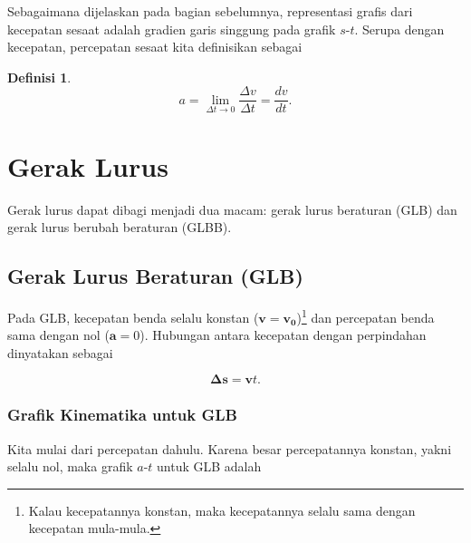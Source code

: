 \documentclass[12pt, a4paper]{article}\usepackage[utf8]{inputenc}
\theoremstyle{plain}
\theoremstyle{plain}
\numberwithin{equation}{section}
\theoremstyle{definition}
\newtheorem{defin}[teorema]{Definisi}
\begin{document}
	Sebagaimana dijelaskan pada bagian sebelumnya, representasi grafis dari kecepatan sesaat adalah gradien garis singgung pada grafik $s$-$t$. Serupa dengan kecepatan, percepatan sesaat kita definisikan sebagai
	
	\begin{defin}
		\vspace{-1em}
		\begin{equation*}
			a = \lim_{\Delta t \to 0} \frac{\Delta v}{\Delta t} = \frac{dv}{dt}.
		\end{equation*}
	\end{defin}
	
	\pagebreak
	
	\section{Gerak Lurus}
	Gerak lurus dapat dibagi menjadi dua macam: gerak lurus beraturan (GLB) dan gerak lurus berubah beraturan (GLBB).
	
	\subsection{Gerak Lurus Beraturan (GLB)}
	
	Pada GLB, kecepatan benda selalu konstan ($\boldsymbol{v} = \boldsymbol{v_0}$)\footnote{Kalau kecepatannya konstan, maka kecepatannya selalu sama dengan kecepatan mula-mula.} dan percepatan benda sama dengan nol ($\boldsymbol{a} = 0$). Hubungan antara kecepatan dengan perpindahan dinyatakan sebagai
	
	\begin{equation}
		\boldsymbol{\Delta s} = \boldsymbol{v} t.
	\end{equation}

	\subsubsection{Grafik Kinematika untuk GLB}
	
	Kita mulai dari percepatan dahulu. Karena besar percepatannya konstan, yakni selalu nol, maka grafik $a$-$t$ untuk GLB adalah
	
\end{document}
